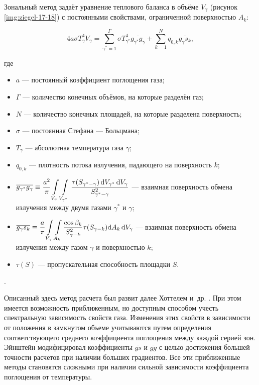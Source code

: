 Зональный метод задаёт уравнение теплового баланса в объёме $V_\gamma$ (рисунок \ref{img:ziegel-17-18}) с постоянными свойствами, ограниченной поверхностью $A_k$:

\begin{equation}
	4a\sigma T^4_\gamma V_\gamma = \sum_{\gamma^* = 1}^{\Gamma} \sigma T^4_{\gamma^*} \overline{g_{\gamma^*} g_\gamma} + \sum_{k=1}^{N} q_{0, k} \overline{g_\gamma s_k},
\end{equation}

\noindent где
\begin{itemize}
	\item $a$ — постоянный коэффициент поглощения газа;
	\item $\Gamma$ — количество конечных объёмов, на которые разделён газ;
	\item $N$ — количество конечных площадей, на которые разделена поверхность;
	\item $\sigma$ — постоянная Стефана — Больцмана;
	\item $T_\gamma$ — абсолютная температура газа $\gamma$;
	\item $q_{0, k}$ — плотность потока излучения, падающего на поверхность $k$;
	\item $\displaystyle \overline{g_{\gamma^*} g_\gamma} \equiv \frac{a^2}{\pi} \int\displaylimits_{V_\gamma} \int\displaylimits_{V_{\gamma^*}} \frac{\tau(S_{\gamma^*-\gamma}) \,\mathrm dV_{\gamma^*} \,\mathrm dV_\gamma}{S^2_{\gamma^*-\gamma}}$ — взаимная поверхность обмена излучения между двумя газами $\gamma^*$ и $\gamma$;
	\item $\displaystyle \overline{g_\gamma s_k} \equiv \frac a\pi  \int\displaylimits_{V_\gamma} \int\displaylimits_{A_k} \frac{\cos{\beta_k}}{S^2_{\gamma-k}} \tau (S_{\gamma - k}) \mathrm dA_k \, \mathrm dV_\gamma$ — взаимная поверхность обмена излучения между газом $\gamma$ и поверхностью $k$;
	\item $\tau(S)$ — пропускательная способность площадки $S$.
\end{itemize}

.

Описанный здесь метод расчета был развит далее Хоттелем
и~др. \cite{hottel-1, hottel-2}. При этом имеется возможность приближенным,
но доступным способом учесть спектральную зависимость свойств
газа. Изменения этих свойств в зависимости от положения в
замкнутом объеме учитываются путем определения соответствующего
среднего коэффициента поглощения между каждой серией зон.
Эйнштейн \cite{einstein-1, einstein-2} модифицировал коэффициенты $\overline{gs}$ и $\overline{gg}$ с целью
достижения большей точности расчетов при наличии больших
градиентов. Все эти приближенные методы становятся сложными
при наличии сильной зависимости коэффициента поглощения
от температуры.

